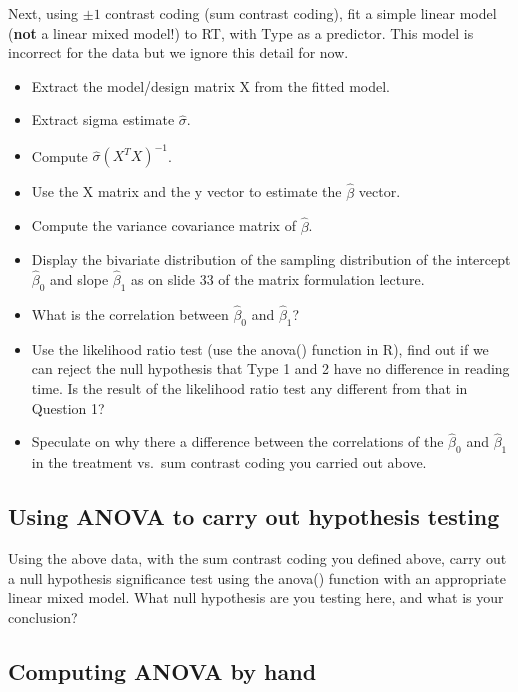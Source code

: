 \documentclass[12pt,]{krantz}
\providecommand{\tightlist}{%
  \setlength{\itemsep}{0pt}\setlength{\parskip}{0pt}}
\begin{document}
Next, using \(\pm 1\) contrast coding (sum contrast coding), fit a simple linear model (\textbf{not} a linear mixed model!) to RT, with Type as a predictor. This model is incorrect for the data but we ignore this detail for now.

\begin{itemize}
\tightlist
\item
  Extract the model/design matrix X from the fitted model.
\item
  Extract sigma estimate \(\hat\sigma\).
\item
  Compute \(\hat\sigma (X^TX)^{-1}\).
\item
  Use the X matrix and the y vector to estimate the \(\hat\beta\) vector.
\item
  Compute the variance covariance matrix of \(\hat\beta\).
\item
  Display the bivariate distribution of the sampling distribution of the intercept \(\hat \beta_0\) and slope \(\hat\beta_1\) as on slide 33 of the matrix formulation lecture.
\item
  What is the correlation between \(\hat \beta_0\) and \(\hat\beta_1\)?
\item
  Use the likelihood ratio test (use the anova() function in R), find out if we can reject the null hypothesis that Type 1 and 2 have no difference in reading time. Is the result of the likelihood ratio test any different from that in Question 1?
\item
  Speculate on why there a difference between the correlations of the \(\hat\beta_0\) and \(\hat\beta_1\) in the treatment vs.~sum contrast coding you carried out above.
\end{itemize}

\hypertarget{sec:LMManova}{%
\subsection{Using ANOVA to carry out hypothesis testing}\label{sec:LMManova}}

Using the above data, with the sum contrast coding you defined above, carry out a null hypothesis significance test using the anova() function with an appropriate linear mixed model. What null hypothesis are you testing here, and what is your conclusion?

\hypertarget{sec:anovabyhand}{%
\subsection{Computing ANOVA by hand}\label{sec:anovabyhand}}
\end{document}
